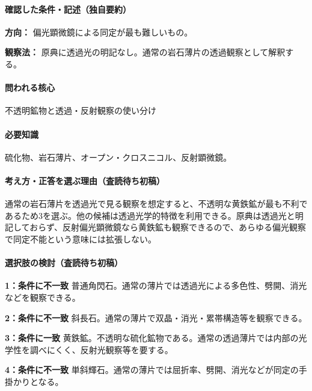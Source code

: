 \paragraph{確認した条件・記述（独自要約）}\mbox{}\par

\noindent\textbf{方向：} 偏光顕微鏡による同定が最も難しいもの。\par

\noindent\textbf{観察法：} 原典に透過光の明記なし。通常の岩石薄片の透過観察として解釈する。\par

\paragraph{問われる核心} 不透明鉱物と透過・反射観察の使い分け

\paragraph{必要知識} 硫化物、岩石薄片、オープン・クロスニコル、反射顕微鏡。

\paragraph{考え方・正答を選ぶ理由（査読待ち初稿）} 通常の岩石薄片を透過光で見る観察を想定すると、不透明な黄鉄鉱が最も不利であるため3を選ぶ。他の候補は透過光学的特徴を利用できる。原典は透過光と明記しておらず、反射偏光顕微鏡なら黄鉄鉱も観察できるので、あらゆる偏光観察で同定不能という意味には拡張しない。

\paragraph{選択肢の検討（査読待ち初稿）}\mbox{}\par

\noindent\textbf{1：条件に不一致} 普通角閃石。通常の薄片では透過光による多色性、劈開、消光などを観察できる。\par

\noindent\textbf{2：条件に不一致} 斜長石。通常の薄片で双晶・消光・累帯構造等を観察できる。\par

\noindent\textbf{3：条件に一致} 黄鉄鉱。不透明な硫化鉱物である。通常の透過薄片では内部の光学性を調べにくく、反射光観察等を要する。\par

\noindent\textbf{4：条件に不一致} 単斜輝石。通常の薄片では屈折率、劈開、消光などが同定の手掛かりとなる。\par

